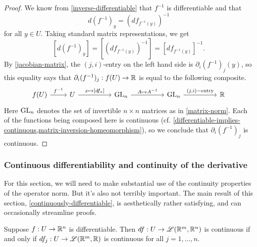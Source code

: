 \begin{proof}
	We know from \cref{inverse-differentiable} that $f^{-1}$ is differentiable and that  
	\[ d(f^{-1})_y = (df_{f^{-1}(y)})^{-1} \]
	for all $y \in U$. Taking standard matrix representations, we get
	\[ [d(f^{-1})_y] = [(df_{f^{-1}(y)})^{-1}] = [df_{f^{-1}(y)}]^{-1}.  \]
	By \cref{jacobian-matrix}, the $(j,i)$-entry on the left hand side is $\partial_i (f^{-1})_j(y)$, so this equality says that $\partial_i (f^{-1})_j : f(U) \to \mathbb{R}$ is equal to the following composite. 
	\[ \begin{tikzcd} f(U) \ar{r}{f^{-1}} & U \ar{rr}{x \mapsto [df_x]} & & \GL_n \ar{rr}{A \mapsto A^{-1}} & & \GL_n \ar{rr}{(j,i)-\text{entry}} & & \R \end{tikzcd} \]
	Here $\operatorname{GL}_n$ denotes the set of invertible $n \times n$ matrices as in \cref{matrix-norm}. Each of the functions being composed here is continuous (cf. 
	\cref{differentiable-implies-continuous,matrix-inversion-homeomorphism}), so we conclude that $\partial_i (f^{-1})_j$ is continuous.  
\end{proof}

\subsubsection*{Continuous differentiability and continuity of the derivative \starred}

For this section, we will need to make substantial use of the continuity properties of the operator norm. But it's also not terribly important. The main result of this section, \cref{continuously-differentiable}, is aesthetically rather satisfying, and can occasionally streamline proofs. 

\begin{lemma} \label{continuously-differentiable-by-components}
	Suppose $f : U \to \mathbb{R}^n$ is differentiable. Then $df : U \to \mathscr{L}(\mathbb{R}^m, \mathbb{R}^n)$ is continuous if and only if $df_j : U \to \mathscr{L}(\mathbb{R}^m, \mathbb{R})$ is continuous for all $j = 1, \dotsc, n$. 
\end{lemma}

